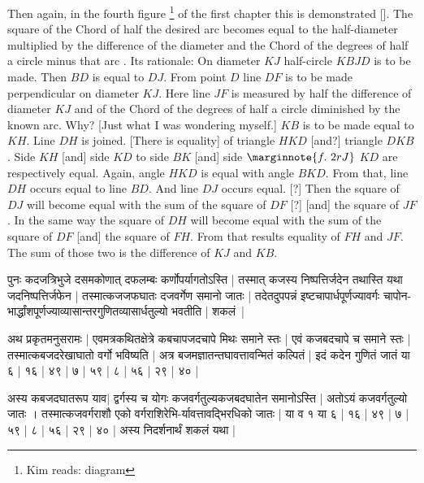\documentclass[12pt]{book}
\begin{document}
\newpage

Then again, in the fourth figure \footnote{Kim reads: diagram} of the first chapter this is demonstrated []. 
The square of the Chord of half the desired arc  becomes
equal to the half-diameter 
multiplied by the difference of the 
diameter and the Chord of the degrees of half a circle minus that arc .
Its rationale: On diameter $KJ$ 
half-circle $KBJD$ is to be made.  Then $BD$ is equal to $DJ$. From point $D$
line $DF$ is to be made perpendicular on diameter $KJ$.  Here line $JF$ is measured
by half the difference of 
diameter $KJ$ and of the Chord of the degrees of half a circle diminished by
the known arc.  Why?  [Just what I was wondering myself.] 
$KB$ is to be made equal to $KH$. Line $DH$ is joined.  [There is equality] of triangle
$HKD$ [and?] triangle $DKB$. Side $KH$ [and] side $KD$ to side $BK$
[and] side
$ \marginnote{f.~2r J}$
$KD$ are respectively equal. 
Again, angle $HKD$ is equal with angle $BKD$. From that, line $DH$ occurs equal
to line $BD$.  And line $DJ$ occurs equal. [?] Then the square of $DJ$ will become 
equal with the sum of the square of $DF$ [?] [and] the square of $JF$. In the 
same way  the 
square of $DH$ will become equal with the sum of the square of $DF$ [and]
the square of $FH$.  From that results equality of $FH$ and $JF$.  The sum of 
those two is the difference of $KJ$ and $KB$. 

\newpage

{\s पुनः कदजत्रिभुजे दसमकोणात् दफलम्बः कर्णोपर्यागतोऽस्ति |
तस्मात् कजस्य निष्पत्तिर्जदेन तथास्ति
यथा जदनिष्पत्तिर्जफेन | तस्मात्कजजफघातः दजवर्गेण समानो जातः |
तदेतदुपपन्नं इष्टचापार्धपूर्णज्यावर्गः चापोन-भार्द्धांशपूर्णज्याव्यासान्तरगुणितव्यासार्धतुल्यो भवतीति |
शकलं~|}

\vskip15pt

{\s अथ प्रकृतमनुसरामः |
एवमत्रकथितक्षेत्रे कबचापजदचापे मिथः समाने स्तः |
एवं कजबदचापे च समाने स्तः | तस्मात्कबजदरेखाघातो वर्गो भविष्यति |
अत्र बजमज्ञातन्तघावत्तावन्मितं कल्पितं | इदं कदेन गुणितं जातं या
६ | १६ | ४९ | ७ | ५९ | ८ | ५६ | २९ | ४० |}

\vskip15pt

{\s [क्षेत्र]}

\vskip15pt

{\s अस्य कबजदघातरूप याव$|$%
द्वर्गस्य च योगः
कजवर्गतुल्यकजबदघातेन समानोऽस्ति | अतोऽयं कजवर्गतुल्यो जातः । तस्मात्कजवर्गराशौ एको
वर्गराशिरेभि-र्यावत्तावद्भिरधिको जातः |
या व १ या ६ | १६ | ४९ | ७ | ५९ | ८ | ५६ | २९ | ४० |
अस्य
निदर्शनार्थं शकलं यथा |} \\
\end{document}
